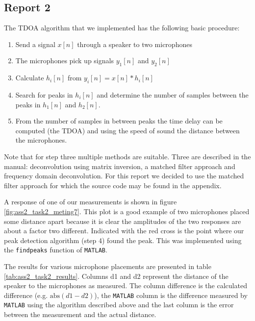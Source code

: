 \documentclass[11pt,titlepage]{report}
\begin{document}
\subsection{Report 2}
The TDOA algorithm that we implemented has the following basic procedure: 
\begin{enumerate}
\item Send a signal $x[n]$ through a speaker to two microphones
\item The microphones pick up signals $y_1[n]$ and $y_2[n]$
\item Calculate $h_i[n]$ from $y_i[n]=x[n]*h_i[n]$ 
\item Search for peaks in $h_i[n]$ and determine the number of samples between the peaks in $h_1[n]$ and $h_2[n]$.
\item From the number of samples in between peaks the time delay can be computed (the TDOA) and using the speed of sound the distance between the microphones.
\end{enumerate}
Note that for step three multiple methods are suitable. Three are described in the manual: deconvolution using matrix inversion, a matched filter approach and frequency domain deconvolution. For this report we decided to use the matched filter approach for which the source code may be found in the appendix. %

A response of one of our measurements is shown in figure \ref{fig:ass2_task2_meting7}. This plot is a good example of two microphones placed some distance apart because it is clear the amplitudes of the two responses are about a factor two different. Indicated with the red cross is the point where our peak detection algorithm (step 4) found the peak. This was implemented using the \texttt{findpeaks} function of \texttt{MATLAB}. 

The results for various microphone placements are presented in table \ref{tab:ass2_task2_results}. Columns d1 and d2 represent the distance of the speaker to the microphones as measured. The column difference is the calculated difference (e.g. $\text{abs}(d1-d2)$), the \texttt{MATLAB} column is the difference measured by \texttt{MATLAB} using the algorithm described above and the last column is the error between the measurement and the actual distance.
\end{document}
